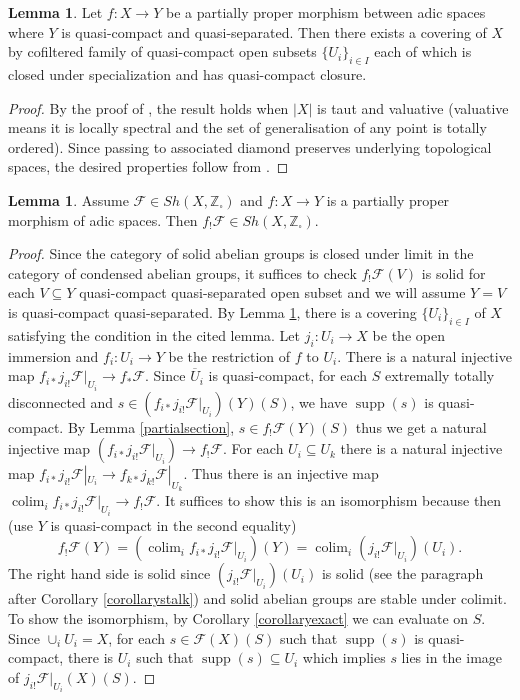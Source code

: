 \documentclass{article}
\theoremstyle{definition}
\newtheorem{lemma}[theorem]{Lemma}
\def\sF{{\mathscr{F}}}
\def\bZ{{\mathbb Z}}
\DeclareMathOperator{\colim}{colim}
\DeclareMathOperator{\supp}{supp}
\begin{document}
\begin{lemma}\label{coveringpartial}
	Let $f:X\to Y$ be a partially proper morphism between adic spaces where $Y$ is quasi-compact and quasi-separated. Then there exists a covering of $X$ by cofiltered family of quasi-compact open subsets $\{U_i\}_{i\in I}$ each of which is closed under specialization and has quasi-compact closure.  
\end{lemma}

\begin{proof}
	By the proof of \cite[Lemma 5.3.3]{huber2013etale}, the result holds when $|X|$ is taut and valuative (valuative means it is locally spectral and the set of generalisation of any point is totally ordered). Since passing to associated diamond preserves underlying topological spaces, the desired properties follow from \cite[Proposition 18.10, 11.19]{scholze2022etale}.
\end{proof}
	
\begin{lemma}\label{imagesolid}
 Assume $\sF\in \mathit{Sh}(X,\bZ_\square)$ and $f:X\to Y$ is a partially proper morphism of adic spaces. Then $f_!\sF\in \mathit{Sh}(X,\bZ_\square)$.
\end{lemma}

\begin{proof}
Since the category of solid abelian groups is closed under limit in the category of condensed abelian groups, it suffices to check $f_!\sF(V)$ is solid for each $V\subseteq Y$ quasi-compact quasi-separated open subset and we will assume $Y=V$ is quasi-compact quasi-separated. By Lemma \ref{coveringpartial}, there is a covering $\{U_i\}_{i\in I}$ of $X$ satisfying the condition in the cited lemma. Let $j_i: U_i\to X$ be the open immersion and $f_i: U_i\to Y$ be the restriction of $f$ to $U_i$. There is a natural injective map $f_{i*}j_{i!}\sF|_{U_i}\to f_*\sF$. Since $\overline{U}_i$ is quasi-compact, for each $S$ extremally totally disconnected and $s\in (f_{i*}j_{i!}\sF|_{U_i})(Y)(S)$, we have $\supp(s)$ is quasi-compact. By Lemma \ref{partialsection}, $s\in f_!\sF(Y)(S)$ thus we get a natural injective map $(f_{i*}j_{i!}\sF|_{U_i})\to f_!\sF$. For each $U_i\subseteq U_k$ there is a natural injective map $f_{i*}j_{i!}\sF|_{U_i}\to f_{k*}j_{k!}\sF|_{U_k}$. Thus there is an injective map $\colim_i f_{i*}j_{i!}\sF|_{U_i}\to f_!\sF$. It suffices to show this is an isomorphism because then (use $Y$ is quasi-compact in the second equality)
$$f_!\sF(Y)= (\colim_i f_{i*}j_{i!}\sF|_{U_i})(Y)=\colim_i (j_{i!}\sF|_{U_i})(U_i).$$
The right hand side is solid since $(j_{i!}\sF|_{U_i})(U_i)$ is solid (see the paragraph after Corollary \ref{corollarystalk}) and solid abelian groups are stable under colimit. To show the isomorphism, by Corollary \ref{corollaryexact} we can evaluate on $S$. Since $\cup_i U_i =X$, for each $s\in \sF(X)(S)$ such that $\supp(s)$ is quasi-compact, there is $U_i$ such that $\supp(s)\subseteq U_i$ which implies $s$ lies in the image of $j_{i!}\sF|_{U_i}(X)(S)$.
\end{proof}
	
\end{document}
